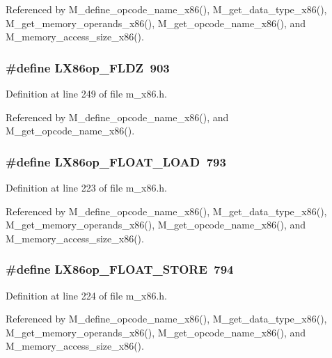 Referenced by M\_\-define\_\-opcode\_\-name\_\-x86(), M\_\-get\_\-data\_\-type\_\-x86(), M\_\-get\_\-memory\_\-operands\_\-x86(), M\_\-get\_\-opcode\_\-name\_\-x86(), and M\_\-memory\_\-access\_\-size\_\-x86().
\subsubsection{\setlength{\rightskip}{0pt plus 5cm}\#define LX86op\_\-FLDZ~903}\label{m__x86_8h_a61db6c2748b81942cabd93ffe6ae88d}




Definition at line 249 of file m\_\-x86.h.

Referenced by M\_\-define\_\-opcode\_\-name\_\-x86(), and M\_\-get\_\-opcode\_\-name\_\-x86().
\subsubsection{\setlength{\rightskip}{0pt plus 5cm}\#define LX86op\_\-FLOAT\_\-LOAD~793}\label{m__x86_8h_0072cd23b9515f5e2831846e1a7857ab}




Definition at line 223 of file m\_\-x86.h.

Referenced by M\_\-define\_\-opcode\_\-name\_\-x86(), M\_\-get\_\-data\_\-type\_\-x86(), M\_\-get\_\-memory\_\-operands\_\-x86(), M\_\-get\_\-opcode\_\-name\_\-x86(), and M\_\-memory\_\-access\_\-size\_\-x86().
\subsubsection{\setlength{\rightskip}{0pt plus 5cm}\#define LX86op\_\-FLOAT\_\-STORE~794}\label{m__x86_8h_b8412668683ebc54aa7efdd36c3e9d40}




Definition at line 224 of file m\_\-x86.h.

Referenced by M\_\-define\_\-opcode\_\-name\_\-x86(), M\_\-get\_\-data\_\-type\_\-x86(), M\_\-get\_\-memory\_\-operands\_\-x86(), M\_\-get\_\-opcode\_\-name\_\-x86(), and M\_\-memory\_\-access\_\-size\_\-x86().
